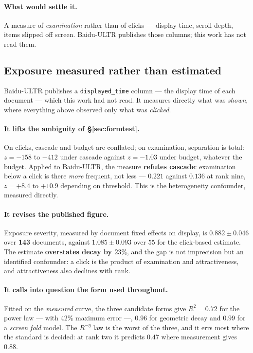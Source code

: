 \documentclass[11pt,a4paper]{article}
\begin{document}
\paragraph{What would settle it.} A measure of \emph{examination} rather than of clicks --- display
time, scroll depth, items slipped off screen. Baidu-ULTR publishes those columns; this work has
not read them.


\subsection{Exposure measured rather than estimated}
\label{sec:measuredexposure}

Baidu-ULTR publishes a \texttt{displayed\_time} column --- the display time of each document ---
which this work had not read. It measures directly what was \emph{shown}, where everything above
observed only what was \emph{clicked}.

\paragraph{It lifts the ambiguity of \S\ref{sec:formtest}.} On clicks, cascade and budget are
conflated; on examination, separation is total: $z = -158$ to $-412$ under cascade against
$z = -1.03$ under budget, whatever the budget. Applied to Baidu-ULTR, the measure \textbf{refutes
cascade}: examination below a click is there \emph{more} frequent, not less --- $0.221$ against
$0.136$ at rank nine, $z = +8.4$ to $+10.9$ depending on threshold. This is the heterogeneity
confounder, measured directly.

\paragraph{It revises the published figure.} Exposure severity, measured by document fixed effects
on display, is $0.882 \pm 0.046$ over \textbf{143} documents, against $1.085 \pm 0.093$ over $55$
for the click-based estimate. The estimate \textbf{overstates decay by $23\%$}, and the gap is not
imprecision but an identified confounder: a click is the product of examination and attractiveness,
and attractiveness also declines with rank.

\paragraph{It calls into question the form used throughout.} Fitted on the \emph{measured} curve,
the three candidate forms give $R^2 = 0.72$ for the power law --- with $42\%$ maximum error ---,
$0.96$ for geometric decay and $0.99$ for a \emph{screen fold} model. The $R^{-\eta}$ law is the
worst of the three, and it errs most where the standard is decided: at rank two it predicts $0.47$
where measurement gives $0.88$.
\end{document}
